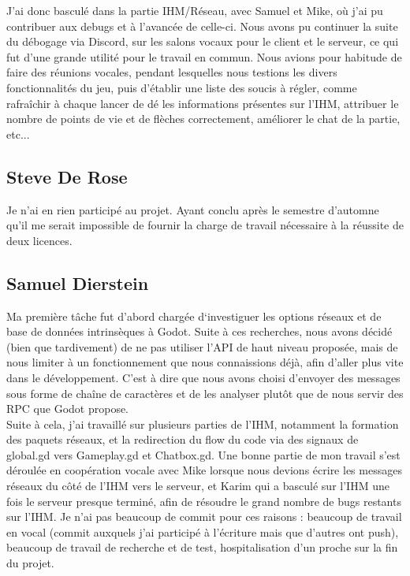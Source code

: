 \documentclass[a4paper,11pt]{article}
\begin{document}
    J’ai donc basculé dans la partie IHM/Réseau, avec Samuel et Mike, où j’ai pu contribuer aux debugs et à l’avancée de celle-ci. Nous avons pu continuer la suite du débogage via Discord, sur les salons vocaux pour le client et le serveur, ce qui fut d’une grande utilité pour le travail en commun. Nous avions pour habitude de faire des réunions vocales, pendant lesquelles nous testions les divers fonctionnalités du jeu, puis d’établir une liste des soucis à régler, comme rafraîchir à chaque lancer de dé les informations présentes sur l’IHM, attribuer le nombre de points de vie et de flèches correctement, améliorer le chat de la partie, etc... \\

\subsection{Steve De Rose}

	Je n’ai en rien participé au projet. Ayant conclu après le semestre d’automne qu’il me serait     impossible de fournir la charge de travail nécessaire à la réussite de deux licences. \\

\subsection{Samuel Dierstein}

	Ma première tâche fut d’abord chargée d‘investiguer les options réseaux et de base de données  intrinsèques à Godot. Suite à ces recherches, nous avons décidé (bien que tardivement) de ne pas utiliser l’API de haut niveau proposée, mais de nous limiter à un fonctionnement que nous connaissions déjà, afin d’aller plus vite dans le développement. C’est à dire que nous avons choisi d’envoyer des messages sous forme de chaîne de caractères et de les analyser plutôt que de nous servir des RPC que Godot propose.  \\

    Suite à cela, j’ai travaillé sur plusieurs parties de l’IHM, notamment la formation des paquets réseaux, et la redirection du flow du code via des signaux de global.gd vers Gameplay.gd et Chatbox.gd. Une bonne partie de mon travail s’est déroulée en coopération vocale avec Mike lorsque nous devions écrire les messages réseaux du côté de l’IHM vers le serveur, et Karim qui a basculé sur l’IHM une fois le serveur presque terminé, afin de résoudre le grand nombre de bugs restants sur l’IHM. Je n’ai pas beaucoup de commit pour ces raisons : beaucoup de travail en vocal (commit auxquels j’ai participé à l’écriture mais que d’autres ont push), beaucoup de travail de recherche et de test, hospitalisation d’un proche sur la fin du projet. \\
\end{document}
